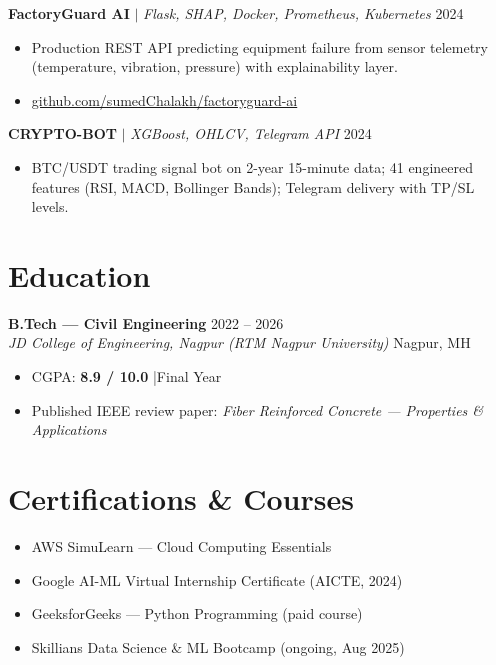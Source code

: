 \documentclass[10pt, letterpaper]{article}
\newcommand{\entry}[4]{%
  \noindent\textbf{#1} \hfill {\small\color{muted}#3}\\
  \textit{\color{muted}#2} \hfill {\small\color{muted}#4}
  \vspace{2pt}%
}
\newcommand{\project}[3]{%
  \noindent\textbf{#1} $\vert$ {\small\textit{#2}} \hfill {\small\color{muted}#3}
  \vspace{2pt}%
}
\begin{document}
\vspace{4pt}
\project{FactoryGuard AI}{Flask, SHAP, Docker, Prometheus, Kubernetes}{2024}
\begin{itemize}
  \item Production REST API predicting equipment failure from sensor telemetry
        (temperature, vibration, pressure) with explainability layer.
  \item \href{https://github.com/sumedChalakh/factoryguard-ai}{github.com/sumedChalakh/factoryguard-ai}
\end{itemize}

\vspace{4pt}
\project{CRYPTO-BOT}{XGBoost, OHLCV, Telegram API}{2024}
\begin{itemize}
  \item BTC/USDT trading signal bot on 2-year 15-minute data; 41 engineered
        features (RSI, MACD, Bollinger Bands); Telegram delivery with TP/SL levels.
\end{itemize}

\section{Education}

\entry{B.Tech — Civil Engineering}{JD College of Engineering, Nagpur (RTM Nagpur University)}{2022 -- 2026}{Nagpur, MH}
\begin{itemize}
  \item CGPA: \textbf{8.9 / 10.0} \quad|\quad Final Year
  \item Published IEEE review paper: \textit{Fiber Reinforced Concrete — Properties \& Applications}
\end{itemize}

\section{Certifications \& Courses}
\begin{itemize}
  \item AWS SimuLearn — Cloud Computing Essentials
  \item Google AI-ML Virtual Internship Certificate (AICTE, 2024)
  \item GeeksforGeeks — Python Programming (paid course)
  \item Skillians Data Science \& ML Bootcamp (ongoing, Aug 2025)
\end{itemize}
\end{document}
